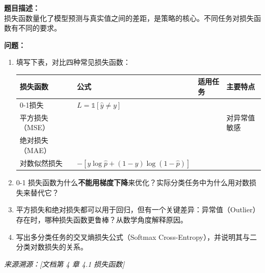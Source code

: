 \documentclass[a4paper,11pt]{ctexart}
\begin{document}
\begin{problembox}
    \textbf{题目描述：}\\
    损失函数量化了模型预测与真实值之间的差距，是策略的核心。不同任务对损失函数有不同的要求。

    \vspace{0.3cm}
    \textbf{问题：}
    \begin{enumerate}[(1)]
        \item 填写下表，对比四种常见损失函数：

        \begin{center}
        \begin{tabular}{p{2.8cm} p{3.5cm} p{3cm} p{3cm}}
            \toprule
            损失函数 & 公式 & 适用任务 & 主要特点 \\
            \midrule
            0-1损失 & $L = \mathbb{1}[\hat{y} \neq y]$ & \underline{\hspace{2.5cm}} & \underline{\hspace{2.5cm}} \\[1.2em]
            平方损失（MSE） & \underline{\hspace{3cm}} & \underline{\hspace{2.5cm}} & 对异常值敏感 \\[1.2em]
            绝对损失（MAE） & \underline{\hspace{3cm}} & \underline{\hspace{2.5cm}} & \underline{\hspace{2.5cm}} \\[1.2em]
            对数似然损失 & $-[y\log\hat{p}+(1-y)\log(1-\hat{p})]$ & \underline{\hspace{2.5cm}} & \underline{\hspace{2.5cm}} \\
            \bottomrule
        \end{tabular}
        \end{center}

        \item 0-1 损失函数为什么\textbf{不能用梯度下降}来优化？实际分类任务中为什么用对数损失来替代它？

        \item 平方损失和绝对损失都可以用于回归，但有一个关键差异：异常值（Outlier）存在时，哪种损失函数更鲁棒？从数学角度解释原因。

        \item 写出多分类任务的交叉熵损失公式（Softmax Cross-Entropy），并说明其与二分类对数损失的关系。
    \end{enumerate}
    {\color{gray}\small\textit{来源溯源：[文档第 4 章 4.1 损失函数]}}
\end{problembox}
\end{document}
